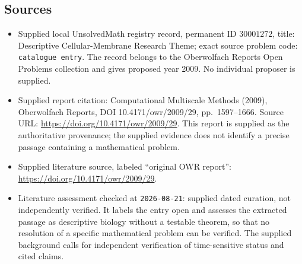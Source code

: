 \documentclass[11pt]{article}
\begin{document}
\subsection{Sources}
\begin{itemize}
\item Supplied local UnsolvedMath registry record, permanent ID \(30001272\), title: Descriptive Cellular-Membrane Research Theme; exact source problem code: \texttt{catalogue entry}. The record belongs to the Oberwolfach Reports Open Problems collection and gives proposed year 2009. No individual proposer is supplied.
\item Supplied report citation: Computational Multiscale Methods (2009), Oberwolfach Reports, DOI 10.4171/owr/2009/29, pp.\ 1597--1666. Source URL: \url{https://doi.org/10.4171/owr/2009/29}. This report is supplied as the authoritative provenance; the supplied evidence does not identify a precise passage containing a mathematical problem.
\item Supplied literature source, labeled ``original OWR report'': \url{https://doi.org/10.4171/owr/2009/29}.
\item Literature assessment checked at \texttt{2026-08-21}: supplied dated curation, not independently verified. It labels the entry open and assesses the extracted passage as descriptive biology without a testable theorem, so that no resolution of a specific mathematical problem can be verified. The supplied background calls for independent verification of time-sensitive status and cited claims.
\end{itemize}
\end{document}
